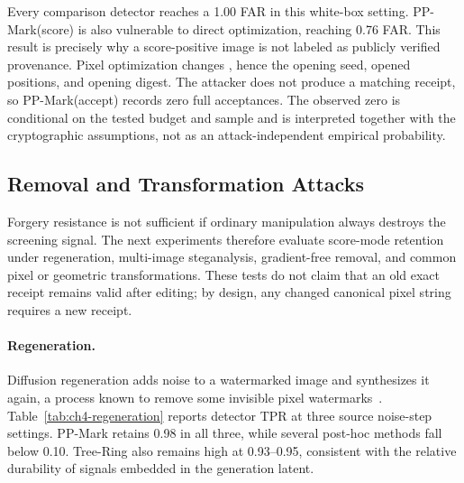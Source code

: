 Every comparison detector reaches a 1.00 FAR in this white-box setting.
PP-Mark(score) is also vulnerable to direct optimization, reaching 0.76 FAR.  This
result is precisely why a score-positive image is not labeled as publicly verified
provenance.  Pixel optimization changes \PPImageHash{}, hence the opening seed,
opened positions, and opening digest.  The attacker does not produce a matching
receipt, so PP-Mark(accept) records zero full acceptances.  The observed zero is
conditional on the tested budget and sample and is interpreted together with the
cryptographic assumptions, not as an attack-independent empirical probability.

\subsection{Removal and Transformation Attacks}
\label{subsec:ch4-removal-transform}

Forgery resistance is not sufficient if ordinary manipulation always destroys the
screening signal.  The next experiments therefore evaluate score-mode retention
under regeneration, multi-image steganalysis, gradient-free removal, and common
pixel or geometric transformations.  These tests do not claim that an old exact
receipt remains valid after editing; by design, any changed canonical pixel string
requires a new receipt.

\paragraph{Regeneration.}
Diffusion regeneration adds noise to a watermarked image and synthesizes it again,
a process known to remove some invisible pixel watermarks~\cite{zhao2024removable}.
Table~\ref{tab:ch4-regeneration} reports detector TPR at three source noise-step
settings.  PP-Mark retains 0.98 in all three, while several post-hoc methods fall
below 0.10.  Tree-Ring also remains high at 0.93--0.95, consistent with the
relative durability of signals embedded in the generation latent.

